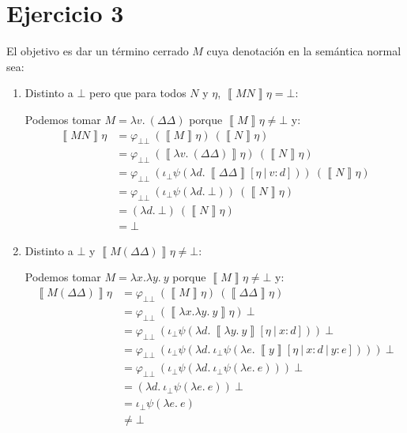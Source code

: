 \documentclass{article}
\newcommand{\sem}[1]{\left\llbracket #1\right\rrbracket}
\newcommand{\bbot}{\bot\!\!\!\bot}
\newcommand{\ibot}{\iota_\bot}
\begin{document}
\section*{Ejercicio 3}
El objetivo es dar un término cerrado $M$ cuya denotación en la semántica normal sea:
\begin{enumerate}[label=(\alph*)]
  \item Distinto a $\bot$ pero que para todos $N$ y $\eta$, $\sem{MN}\eta = \bot$:

    Podemos tomar $M = \lambda v.\ (\Delta\Delta)$ porque $\sem{M}\eta \neq \bot$ y:
    \begin{equation*}
      \begin{aligned}
        \sem{MN}\eta &= \varphi_{\bbot}\ (\sem{M}\eta)\ (\sem{N}\eta) \\ 
                     &= \varphi_{\bbot}\ (\sem{\lambda v.\ (\Delta\Delta)}\eta)\ (\sem{N}\eta) \\ 
                     &= \varphi_{\bbot}\ (\ibot\psi(\lambda d.\ \sem{\Delta\Delta}[\eta\ |\ v : d]))\ (\sem{N}\eta) \\ 
                     &= \varphi_{\bbot}\ (\ibot\psi(\lambda d.\ \bot))\ (\sem{N}\eta) \\ 
                     &= (\lambda d.\ \bot)\ (\sem{N}\eta) \\ 
                     &= \bot
      \end{aligned}
    \end{equation*}

  \item Distinto a $\bot$ y $\sem{M(\Delta\Delta)}\eta \neq \bot$:

    Podemos tomar $M = \lambda x.\lambda y.\ y$ porque $\sem{M}\eta \neq \bot$ y:
    \begin{equation*}
      \begin{aligned}
        \sem{M(\Delta\Delta)}\eta &= \varphi_{\bbot}\ (\sem{M}\eta)\ (\sem{\Delta\Delta}\eta) \\ 
                                  &= \varphi_{\bbot}\ (\sem{\lambda x.\lambda y.\ y}\eta)\ \bot \\ 
                                  &= \varphi_{\bbot}\ (\ibot\psi(\lambda d.\ \sem{\lambda y.\ y}[\eta\ |\ x : d]))\ \bot \\ 
                                  &= \varphi_{\bbot}\ (\ibot\psi(\lambda d.\ \ibot\psi(\lambda e.\ \sem{y}[\eta\ |\ x : d\ |\ y : e])))\ \bot \\ 
                                  &= \varphi_{\bbot}\ (\ibot\psi(\lambda d.\ \ibot\psi(\lambda e.\ e)))\ \bot \\ 
                                  &= (\lambda d.\ \ibot\psi(\lambda e.\ e))\ \bot \\ 
                                  &= \ibot\psi(\lambda e.\ e) \\ 
                                  &\neq \bot
      \end{aligned}
    \end{equation*}
\end{enumerate}
\end{document}

